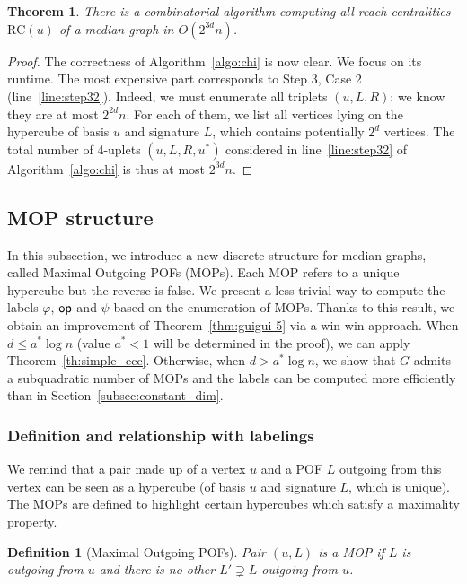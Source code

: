 \documentclass{article}
\newtheorem{theorem}{Theorem}
\newtheorem{definition}{Definition}
\newcommand{\opp}{\mbox{\textsf{op}}}
\newcommand{\rc}{\mbox{RC}}
\begin{document}
\begin{theorem}
There is a combinatorial algorithm computing all  reach centralities $\rc(u)$ of a median graph in $\tilde{O}(2^{3d}n)$.
\label{th:simple_rc}
\end{theorem}
\begin{proof}
The correctness of Algorithm~\ref{algo:chi} is now clear. We focus on its runtime. The most expensive part corresponds to Step 3, Case 2 (line~\ref{line:step32}). Indeed, we must enumerate all triplets $(u,L,R)$: we know they are at most $2^{2d}n$. For each of them, we list all vertices lying on the hypercube of basis $u$ and signature $L$, which contains potentially $2^d$ vertices. The total number of 4-uplets $(u,L,R,u^*)$ considered in line~\ref{line:step32} of Algorithm~\ref{algo:chi} is thus at most $2^{3d}n$.
\end{proof}

\subsection{MOP structure} \label{subsec:mop}

In this subsection, we introduce a new discrete structure for median graphs, called Maximal Outgoing POFs (MOPs). Each MOP refers to a unique hypercube but the reverse is false. We present a less trivial way to compute the labels $\varphi$, $\opp$ and $\psi$ based on the enumeration of MOPs. Thanks to this result, we obtain an improvement of Theorem~\ref{thm:guigui-5} via a win-win approach. When $d \le a^*\log n$ (value $a^*<1$ will be determined in the proof), we can apply Theorem~\ref{th:simple_ecc}. Otherwise, when $d > a^* \log n$, we show that $G$ admits a subquadratic number of MOPs and the labels can be computed more efficiently than in Section~\ref{subsec:constant_dim}.

\subsubsection{Definition and relationship with labelings} \label{subsubsec:def_mop}

We remind that a pair made up of a vertex $u$ and a POF $L$ outgoing from this vertex can be seen as a hypercube (of basis $u$ and signature $L$, which is unique). The MOPs are defined to highlight certain hypercubes which satisfy a maximality property.

\begin{definition}[Maximal Outgoing POFs]
Pair $(u,L)$ is a MOP if $L$ is outgoing from $u$ and there is no other $L' \supsetneq L$ outgoing from $u$.
\label{def:mop}
\end{definition}
\end{document}
